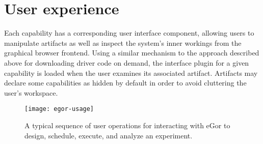 \documentclass[../thesis]{subfiles}
\begin{document}
\section{User experience}
Each capability has a corresponding user interface component, allowing
users to manipulate artifacts as well as inspect the system's inner
workings from the graphical browser frontend. Using a similar mechanism to
the approach described above for downloading driver code on demand,
the interface plugin for a given capability is loaded when the
user examines its associated artifact. Artifacts may declare some
capabilities as hidden by default in order to avoid cluttering the
user's workspace.

\begin{figure}
  \texttt{[image: egor-usage]}
  \caption{
    A typical sequence of user operations for interacting with eGor to
    design, schedule, execute, and analyze an experiment.
    \label{fig:EgorUsage}
  }
\end{figure}
\end{document}
